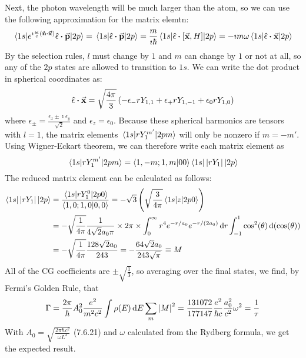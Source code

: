 \documentclass[a4paper,twoside]{article}
\begin{document}
\begin{problem}
    Next, the photon wavelength will be much larger than the atom, so we can use the following approximation for the matrix elemtn:
    \begin{equation}
        \mel{1s}{e^{\imath \frac{\omega}{c} (\vu{n} \vdot \va{x})} \vu{\epsilon} \vdot \va{p}}{2p} = \mel{1s}{\vu{\epsilon} \vdot \va{p}}{2p} = \frac{m}{\imath \hbar} \mel{1s}{\vu{\epsilon} \vdot \comm{\va{x}}{H}}{2p} = - \imath m \omega \mel{1s}{\vu{\epsilon} \vdot \va{x}}{2p}
    \end{equation}
    By the selection rules, $ l $ must change by $ 1 $ and $ m $ can change by $ 1 $ or not at all, so any of the $ 2p $ states are allowed to transition to $ 1s $. We can write the dot product in spherical coordinates as:
    \begin{equation}
        \vu{\epsilon} \vdot \va{x} = \sqrt{\frac{4 \pi}{3}} \left( - \epsilon_- r Y_{1,1} + \epsilon_+ r Y_{1,-1} + \epsilon_0 r Y_{1,0} \right)
    \end{equation}
    where $ \epsilon_{\pm} = \frac{\epsilon_x \pm \imath \epsilon_{y}}{\sqrt{2}} $ and $ \epsilon_z = \epsilon_0 $. Because these spherical harmonics are tensors with $ l=1 $, the matrix elements $ \mel{1s}{rY_1^{m'}}{2pm} $ will only be nonzero if $ m = -m' $. Using Wigner-Eckart theorem, we can therefore write each matrix element as
    \begin{equation}
        \mel{1s}{rY_{1}^{m'}}{2pm} =\bra{1,-m;1,m}\ket{00}\bra{1s} |rY_1|\ket{2p}
    \end{equation}
    The reduced matrix element can be calculated as follows:
    \begin{align}
        \bra{1s} |rY_1|\ket{2p} &= \frac{\mel{1s}{r Y_1^0}{2p0}}{\bra{1,0;1,0}\ket{0,0}} = - \sqrt{3} \left( \sqrt{\frac{3}{4 \pi}} \mel{1s}{z}{2p0} \right) \\
        &= - \sqrt{\frac{1}{4 \pi}} \frac{1}{4 \sqrt{2} a_0 \pi} \times 2 \pi \times \int_0^{\infty} r^4 e^{-r/a_0} e^{-r/(2a_0)} \dd{r} \int_{-1}^{1} \cos[2](\theta) \dd{(\cos(\theta))} \\
        &= - \sqrt{\frac{1}{4 \pi}} \frac{128 \sqrt{2} a_0}{243} = - \frac{64 \sqrt{2} a_0}{243 \sqrt{\pi}} \equiv M
    \end{align}
    All of the CG coefficients are $ \pm \sqrt{\frac{1}{3}} $, so averaging over the final states, we find, by Fermi's Golden Rule, that
    \begin{equation}
        \Gamma = \frac{2 \pi}{\hbar} A_0^2 \frac{e^2}{m^2 c^2} \int \rho(E) \dd{E} \sum_m \abs{M}^2 = \frac{131072}{177147} \frac{e^2}{\hbar c} \frac{a_0^2}{c^2} \omega^2 = \frac{1}{\tau}
    \end{equation}
    With $ A_0 = \sqrt{\frac{2 \pi \hbar c^2}{\omega L^3}} $ (7.6.21) and $ \omega $ calculated from the Rydberg formula, we get the expected result.
    
\end{problem}
\end{document}
